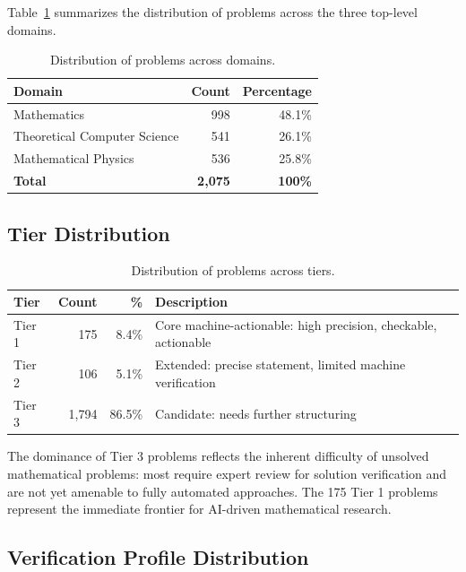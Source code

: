 \documentclass[11pt]{article}
\begin{document}
Table~\ref{tab:domains} summarizes the distribution of problems across the three top-level domains.

\begin{table}[H]
\centering
\caption{Distribution of problems across domains.}
\label{tab:domains}
\begin{tabular}{@{}lrr@{}}
\toprule
\textbf{Domain} & \textbf{Count} & \textbf{Percentage} \\
\midrule
Mathematics & 998 & 48.1\% \\
Theoretical Computer Science & 541 & 26.1\% \\
Mathematical Physics & 536 & 25.8\% \\
\midrule
\textbf{Total} & \textbf{2{,}075} & \textbf{100\%} \\
\bottomrule
\end{tabular}
\end{table}

\subsection{Tier Distribution}

\begin{table}[H]
\centering
\caption{Distribution of problems across tiers.}
\label{tab:tiers}
\begin{tabular}{@{}lrrp{7.5cm}@{}}
\toprule
\textbf{Tier} & \textbf{Count} & \textbf{\%} & \textbf{Description} \\
\midrule
Tier 1 & 175 & 8.4\% & Core machine-actionable: high precision, checkable, actionable \\
Tier 2 & 106 & 5.1\% & Extended: precise statement, limited machine verification \\
Tier 3 & 1{,}794 & 86.5\% & Candidate: needs further structuring \\
\bottomrule
\end{tabular}
\end{table}

The dominance of Tier 3 problems reflects the inherent difficulty of unsolved mathematical problems: most require expert review for solution verification and are not yet amenable to fully automated approaches.
The 175 Tier 1 problems represent the immediate frontier for AI-driven mathematical research.

\subsection{Verification Profile Distribution}
\end{document}
